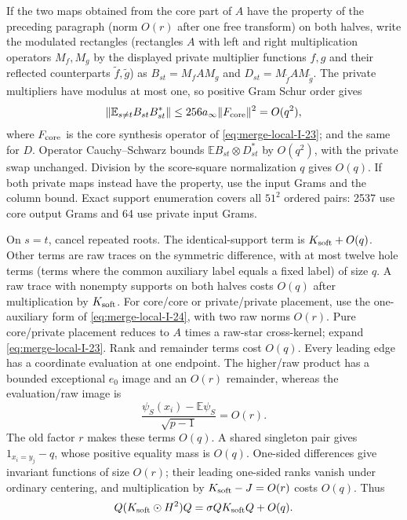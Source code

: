 If the two maps obtained from the core part of $A$ have the
property of the preceding paragraph (norm $O(r)$ after one free
transform) on both halves, write the modulated rectangles
(rectangles $A$ with left and right multiplication operators
$M_f,M_g$ by the displayed private multiplier functions $f,g$
and their reflected counterparts $\tilde f,\tilde g$) as
$B_{st}=M_fAM_g$ and
$D_{st}=M_{\tilde f}AM_{\tilde g}$. The private multipliers have
modulus at most one, so positive Gram Schur order gives
\begin{equation}\label{eq:merge-local-I-24}
 \left\|\mathbb E_{s\ne t}B_{st}B_{st}^*\right\|
 \le256a_\infty\|F_{\rm core}\|^2=O(q^2),
\end{equation}
where $F_{\rm core}$ is the core synthesis operator of
\eqref{eq:merge-local-I-23}; and the same for $D$. Operator Cauchy--Schwarz bounds
$\mathbb E B_{st}\otimes D_{st}^*$ by $O(q^2)$, with the private
swap unchanged. Division by the score-square normalization $q$
gives $O(q)$. If both private maps instead have the property,
use the input Grams and the column bound. Exact support
enumeration covers all $51^2$ ordered pairs: 2537 use core output
Grams and 64 use private input Grams.

On $s=t$, cancel repeated roots. The identical-support term is
$K_{\rm soft}+O(q)$. Other terms are raw traces on the symmetric
difference, with at most twelve hole terms (terms where the
common auxiliary label equals a fixed label) of size $q$.
A raw trace with nonempty supports on both halves costs $O(q)$
after multiplication by $K_{\rm soft}$. For core/core or
private/private placement, use the one-auxiliary form of
\eqref{eq:merge-local-I-24}, with two raw norms $O(r)$. Pure core/private placement
reduces to $A$ times a raw-star cross-kernel; expand \eqref{eq:merge-local-I-23}.
Rank and remainder terms cost $O(q)$. Every leading edge has
a coordinate evaluation at one endpoint. The higher/raw
product has a bounded exceptional $e_0$ image and an $O(r)$
remainder, whereas the evaluation/raw image is
\begin{equation}\label{eq:merge-local-I-25}
 \frac{\psi_S(x_i)-\mathbb E\psi_S}{\sqrt{p-1}}=O(r).
\end{equation}
The old factor $r$ makes these terms $O(q)$. A shared singleton
pair gives $1_{x_i=y_j}-q$, whose positive equality mass is
$O(q)$. One-sided differences give invariant functions of size
$O(r)$; their leading one-sided ranks vanish under ordinary
centering, and multiplication by $K_{\rm soft}-J=O(r)$ costs
$O(q)$. Thus
\begin{equation}\label{eq:merge-local-I-26}
 Q(K_{\rm soft}\odot H^2)Q=\sigma QK_{\rm soft}Q+O(q).
\end{equation}

